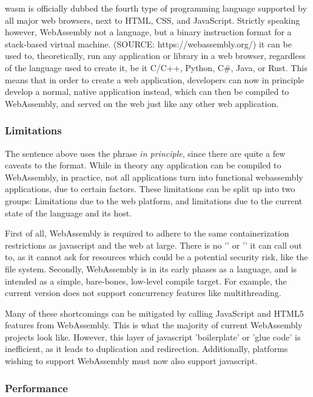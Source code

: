 \ac{wasm} is officially dubbed the fourth type of programming language supported by all major web browsers, next to HTML, CSS, and JavaScript.
Strictly speaking however, WebAssembly not a language, but a binary instruction format for a stack-based virtual machine.
(SOURCE: https://webassembly.org/)
it can be used to, theoretically, run any application or library in a web browser, regardless of the language used to create it, be it C/C++, Python, C\#, Java, or Rust. 
This means that in order to create a web application, developers can now in principle develop a normal, native application instead, which can then be compiled to WebAssembly, and served on the web just like any other web application. 

\subsubsection*{Limitations}

The sentence above uses the phrase \emph{in principle}, since there are quite a few caveats to the format. 
While in theory any application can be compiled to WebAssembly, in practice, not all applications turn into functional webassembly applications, due to certain factors.
These limitations can be split up into two groups: 
Limitations due to the web platform, and limitations due to the current state of the language and its host.

First of all, WebAssembly is required to adhere to the same containerization restrictions as javascript and the web at large. 
There is no '' or '' it can call out to, as it cannot ask for resources which could be a potential security risk, like the file system.
Secondly, WebAssembly is in its early phases as a language, and is intended as a simple, bare-bones, low-level compile target. 
For example, the current version does not support concurrency features like multithreading.

Many of these shortcomings can be mitigated by calling JavaScript and HTML5 features from WebAssembly. 
This is what the majority of current WebAssembly projects look like. 
However, this layer of javascript 'boilerplate' or 'glue code' is inefficient, as it leads to duplication and redirection.
Additionally, platforms wishing to support WebAssembly must now also support javascript. 

\subsubsection*{Performance}

